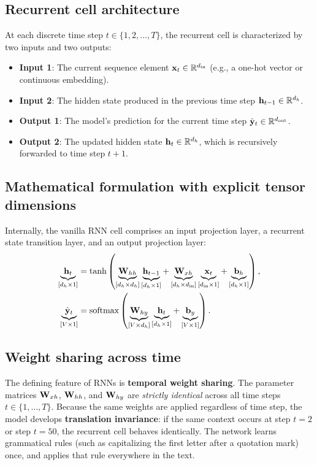 \documentclass[../../main.tex]{subfiles}
\begin{document}
\subsection{Recurrent cell architecture}
At each discrete time step $t \in \{1, 2, \dots, T\}$, the recurrent cell is characterized by two inputs and two outputs:
\begin{itemize}
    \item \textbf{Input 1}: The current sequence element $\mathbf{x}_t \in \mathbb{R}^{d_{\text{in}}}$ (e.g., a one-hot vector or continuous embedding).
    \item \textbf{Input 2}: The hidden state produced in the previous time step $\mathbf{h}_{t-1} \in \mathbb{R}^{d_h}$.
    \item \textbf{Output 1}: The model's prediction for the current time step $\hat{\mathbf{y}}_t \in \mathbb{R}^{d_{\text{out}}}$.
    \item \textbf{Output 2}: The updated hidden state $\mathbf{h}_t \in \mathbb{R}^{d_h}$, which is recursively forwarded to time step $t+1$.
\end{itemize}

\subsection{Mathematical formulation with explicit tensor dimensions}
Internally, the vanilla RNN cell comprises an input projection layer, a recurrent state transition layer, and an output projection layer:
\begin{align}
\underbrace{\mathbf{h}_t}_{[d_h \times 1]} &= \tanh\left( \underbrace{\mathbf{W}_{hh}}_{[d_h \times d_h]} \underbrace{\mathbf{h}_{t-1}}_{[d_h \times 1]} + \underbrace{\mathbf{W}_{xh}}_{[d_h \times d_{\text{in}}]} \underbrace{\mathbf{x}_t}_{[d_{\text{in}} \times 1]} + \underbrace{\mathbf{b}_h}_{[d_h \times 1]} \right), \label{eq:rnn_hidden_step} \\
\underbrace{\hat{\mathbf{y}}_t}_{[V \times 1]} &= \operatorname{\mathrm{softmax}}\left( \underbrace{\mathbf{W}_{hy}}_{[V \times d_h]} \underbrace{\mathbf{h}_t}_{[d_h \times 1]} + \underbrace{\mathbf{b}_y}_{[V \times 1]} \right). \label{eq:rnn_output_step}
\end{align}

\subsection{Weight sharing across time}
The defining feature of RNNs is \textbf{temporal weight sharing}. The parameter matrices $\mathbf{W}_{xh}$, $\mathbf{W}_{hh}$, and $\mathbf{W}_{hy}$ are \emph{strictly identical} across all time steps $t \in \{1, \dots, T\}$. 
Because the same weights are applied regardless of time step, the model develops \textbf{translation invariance}: if the same context occurs at step $t=2$ or step $t=50$, the recurrent cell behaves identically. The network learns grammatical rules (such as capitalizing the first letter after a quotation mark) once, and applies that rule everywhere in the text.
\end{document}
